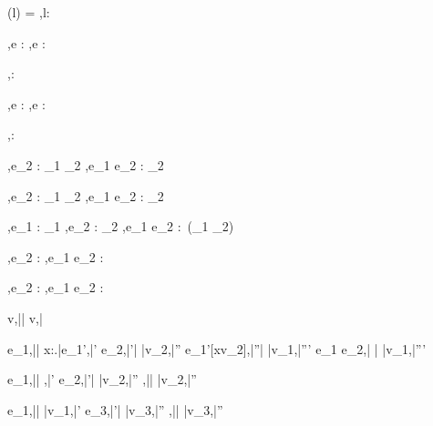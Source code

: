   {\Sigma(l) = \beta}
  {\Gamma,\Sigma\infers l:\Reference \beta}


  {\Gamma,\Sigma \infers e : \tau}
  {\Gamma,\Sigma \infers \Edit e : \Task \tau}

  {}
  {\Gamma,\Sigma \infers \Enter \tau : \Task \tau}

  {\Gamma,\Sigma \infers e : \Reference \beta}
  {\Gamma,\Sigma \infers \Update e : \Task \beta}


  {}
  {\Gamma,\Sigma \infers \Fail : \Task \tau}


  {
   {\Gamma,\Sigma \infers e_2 : \tau_1 \to \Task \tau_2}}
  {\Gamma,\Sigma \infers e_1 \Then e_2 : \Task \tau_2}


  {
   {\Gamma,\Sigma \infers e_2 : \tau_1 \to \Task \tau_2}}
  {\Gamma,\Sigma \infers e_1 \Next e_2 : \Task \tau_2}


  {\Gamma,\Sigma \infers e_1 : \Task \tau_1 \Quad
   \Gamma,\Sigma \infers e_2 : \Task \tau_2}
  {\Gamma,\Sigma \infers e_1 \And e_2 : \Task\,(\tau_1 \times \tau_2)}


  {
   {\Gamma,\Sigma \infers e_2 : \Task \tau}}
  {\Gamma,\Sigma \infers e_1 \Or e_2 : \Task \tau}


  {
   {\Gamma,\Sigma \infers e_2 : \Task \tau}}
  {\Gamma,\Sigma \infers e_1 \Xor e_2 : \Task \tau}


  {}
  {v,\bar{\sigma}\bar{\eval} v,\bar{\sigma}}


  {e_1,\bar{\sigma}\bar{\eval} \lambda x:\tau.\bar{e_1'},\bar{\sigma'}\Quad
   e_2,\bar{\sigma'}\bar{\eval} \bar{v_2},\bar{\sigma''}\Quad
   e_1'[x\mapsto v_2],\bar{\sigma''}\bar{\eval} \bar{v_1},\bar{\sigma'''}}
  {e_1 e_2,\bar{\sigma} \bar{\eval} \bar{v_1},\bar{\sigma'''}}


  {e_1,\bar{\sigma}\bar{\eval} \True,\bar{\sigma'}\Quad
   e_2,\bar{\sigma'}\bar{\eval} \bar{v_2},\bar{\sigma''}}
  {,\bar{\sigma}\bar{\eval} \bar{v_2},\bar{\sigma''}}

  {e_1,\bar{\sigma}\bar{\eval} \bar{v_1},\bar{\sigma'} \Quad
   e_3,\bar{\sigma'}\bar{\eval} \bar{v_3},\bar{\sigma''}}
  {,\bar{\sigma}\bar{\eval} \bar{v_3},\bar{\sigma''}}


